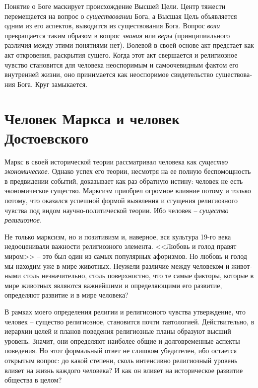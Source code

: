 \documentclass{book}
\begin{document}
Понятие о Боге маскирует происхождение Высшей Цели. Центр тяжести перемещается на вопрос о \textit{существовании}  Бога, а Высшая Цель объявляется одним из его аспектов, выводится из существования Бога. Вопрос \textit{воли}  превращается таким обра­зом в вопрос \textit{знания}  или \textit{веры}  (принципиального различия между этими понятиями нет). Волевой в своей основе акт предстает как акт откровения, раскрытия сущего. Когда этот акт свершается и религиозное чувство становится для человека неоспоримым и самоочевидным фактом его внутренней жизни, оно принимается как неоспоримое свидетельство существова­ния Бога. Круг замыкается. 


\section{Человек Маркса и человек Достоевского}

Маркс в своей исторической теории рассматривал человека как \textit{существо экономическое.}  Однако успех его теории, несмот­ря на ее полную беспомощность в предвидении событий, дока­зывает как раз обратную истину: человек не есть экономиче­ское существо. Марксизм приобрел огромное влияние потому и только потому, что оказался успешной формой выявления и сгущения религиозного чувства под видом научно-политической теории. Ибо человек -- \textit{существо религиозное.}

Не только марксизм, но и позитивизм и, наверное, вся куль­тура 19-го века недооценивали важности религиозного элемен­та. <<Любовь и голод правят миром>> -- это был один из самых популярных афоризмов. Но любовь и голод мы находим уже в мире животных. Неужели различие между человеком и живот­ными столь незначительно, столь поверхностно, что те самые факторы, которые в мире животных являются важнейшими и определяющими его развитие, определяют развитие и в мире человека?

В рамках моего определения религии и религиозного чувст­ва утверждение, что человек -- существо религиозное, становит­ся почти тавтологией. Действительно, в иерархии целей и планов поведения религиозные планы образуют высший уровень. Зна­чит, они определяют наиболее общие и долговременные аспек­ты поведения. Но этот формальный ответ не слишком убеди­телен, ибо остается открытым вопрос: до какой степени, сколь интенсивно религиозный уровень влияет на жизнь каждого человека? И как он влияет на историческое развитие общест­ва в целом?
\end{document}

